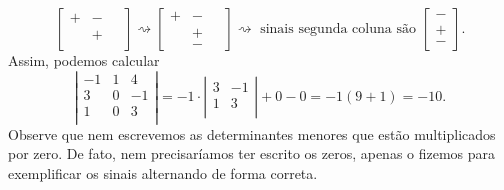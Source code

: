 \documentclass[../livro.tex]{subfiles}  %
\begin{document}
\begin{example}
\begin{equation}
\begin{bmatrix}
+ & - & \,\,  \\
& + & \,\,  \\
\,\,& \,\, &  \,\, 
\end{bmatrix} \rightsquigarrow 
\begin{bmatrix}
+ & - &  \,\, \\
\,\,& + &  \,\, \\
\,\,& - &  \,\, 
\end{bmatrix}\rightsquigarrow \text{ sinais segunda coluna são }
\begin{bmatrix}
- \\ + \\ -
\end{bmatrix}.
\end{equation} Assim, podemos calcular
\begin{equation}
\left| 
\begin{matrix}
-1 & 1 & 4 \\
3 & 0 & -1 \\
1 & 0 & 3 \\
\end{matrix}
\right| = -1 \cdot 
\left| 
\begin{matrix}
3  & -1 \\
1  & 3 \\
\end{matrix}
\right| + 0 - 0 = -1 (9 + 1) = -10.
\end{equation} Observe que nem escrevemos as determinantes menores que estão multiplicados por zero. De fato, nem precisaríamos ter escrito os zeros, apenas o fizemos para exemplificar os sinais alternando de forma correta.


\end{example}
\end{document}
